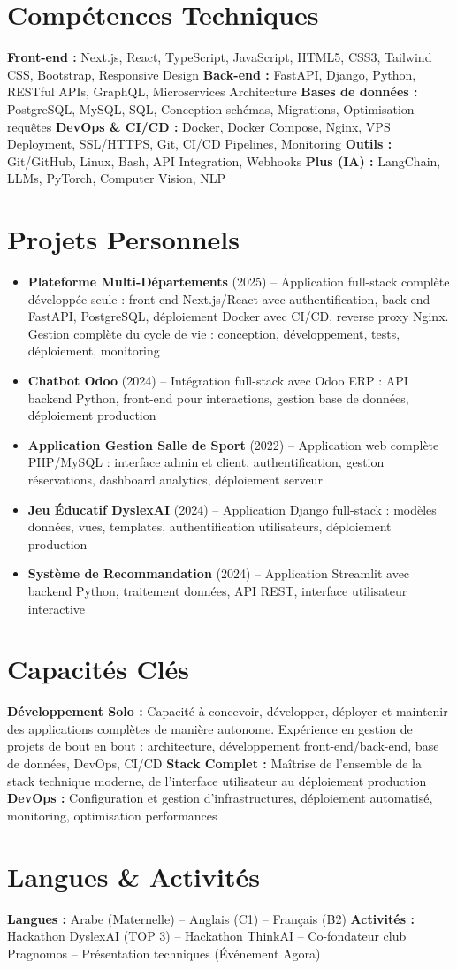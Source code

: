 \documentclass[10pt,a4paper]{article}
\begin{document}
\section*{Compétences Techniques}
\textbf{Front-end :} Next.js, React, TypeScript, JavaScript, HTML5, CSS3, Tailwind CSS, Bootstrap, Responsive Design \quad
\textbf{Back-end :} FastAPI, Django, Python, RESTful APIs, GraphQL, Microservices Architecture \quad
\textbf{Bases de données :} PostgreSQL, MySQL, SQL, Conception schémas, Migrations, Optimisation requêtes \quad
\textbf{DevOps \& CI/CD :} Docker, Docker Compose, Nginx, VPS Deployment, SSL/HTTPS, Git, CI/CD Pipelines, Monitoring \quad
\textbf{Outils :} Git/GitHub, Linux, Bash, API Integration, Webhooks \quad
\textbf{Plus (IA) :} LangChain, LLMs, PyTorch, Computer Vision, NLP

\section*{Projets Personnels}
\begin{itemize}
    \item \textbf{Plateforme Multi-Départements} (2025) -- Application full-stack complète développée seule : front-end Next.js/React avec authentification, back-end FastAPI, PostgreSQL, déploiement Docker avec CI/CD, reverse proxy Nginx. Gestion complète du cycle de vie : conception, développement, tests, déploiement, monitoring
    \item \textbf{Chatbot Odoo} (2024) -- Intégration full-stack avec Odoo ERP : API backend Python, front-end pour interactions, gestion base de données, déploiement production
    \item \textbf{Application Gestion Salle de Sport} (2022) -- Application web complète PHP/MySQL : interface admin et client, authentification, gestion réservations, dashboard analytics, déploiement serveur
    \item \textbf{Jeu Éducatif DyslexAI} (2024) -- Application Django full-stack : modèles données, vues, templates, authentification utilisateurs, déploiement production
    \item \textbf{Système de Recommandation} (2024) -- Application Streamlit avec backend Python, traitement données, API REST, interface utilisateur interactive
\end{itemize}

\section*{Capacités Clés}
\textbf{Développement Solo :} Capacité à concevoir, développer, déployer et maintenir des applications complètes de manière autonome. Expérience en gestion de projets de bout en bout : architecture, développement front-end/back-end, base de données, DevOps, CI/CD \quad
\textbf{Stack Complet :} Maîtrise de l'ensemble de la stack technique moderne, de l'interface utilisateur au déploiement production \quad
\textbf{DevOps :} Configuration et gestion d'infrastructures, déploiement automatisé, monitoring, optimisation performances

\section*{Langues \& Activités}
\textbf{Langues :} Arabe (Maternelle) -- Anglais (C1) -- Français (B2) \quad
\textbf{Activités :} Hackathon DyslexAI (TOP 3) -- Hackathon ThinkAI -- Co-fondateur club Pragnomos -- Présentation techniques (Événement Agora)
\end{document}
